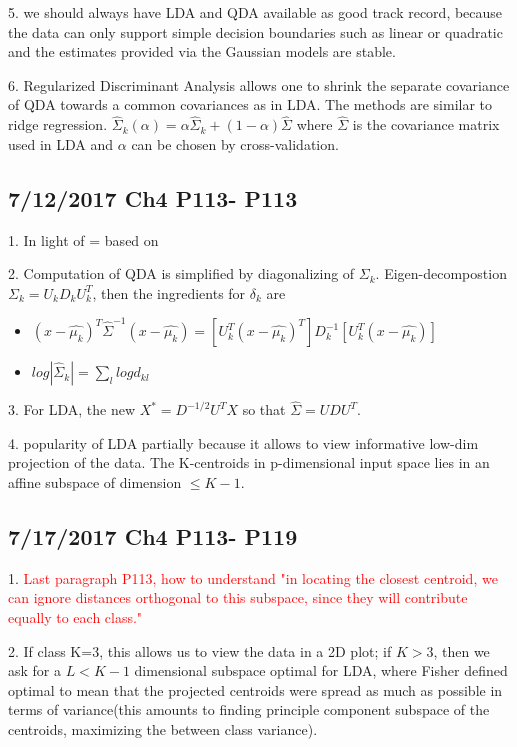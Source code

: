 \documentclass[a4paper, 12pt]{article}
\begin{document}
5. we should always have LDA and QDA available as good track record, because the data can only support simple decision boundaries such as linear or quadratic and the estimates provided via the Gaussian models are stable.

6. Regularized Discriminant Analysis allows one to shrink the separate covariance of QDA towards a common covariances as in LDA. The methods are similar to ridge regression. $\hat{\Sigma}_k(\alpha)=\alpha\hat{\Sigma}_k + (1-\alpha)\hat{\Sigma}$ where $\hat{\Sigma}$ is the covariance matrix used in LDA and $\alpha$ can be chosen by cross-validation.

\subsection*{7/12/2017 Ch4 P113- P113 }

1. In light of = based on

2. Computation of QDA is simplified by diagonalizing of $\Sigma_k$. Eigen-decompostion $\Sigma_k=U_kD_kU^T_k$, then the ingredients for $\delta_k$ are 
\begin{itemize}
	\item $(x-\hat{\mu_k})^T\hat{\Sigma}^{-1}(x-\hat{\mu_k})=[U^T_k(x-\hat{\mu_k})^T]D_k^{-1}[U^T_k(x-\hat{\mu_k})]$
	\item $log|\hat{\Sigma}_k|=\sum_{l}log d_{kl}$
\end{itemize}

3. For LDA, the new $X^*=D^{-1/2}U^TX$ so that $\hat{\Sigma}=UDU^T$.

4. popularity of LDA partially because it allows to view informative low-dim projection of the data. The K-centroids in p-dimensional input space lies in an affine subspace of dimension $\le K-1$.

\subsection*{7/17/2017 Ch4 P113- P119 }

1. \textcolor{red}{Last paragraph P113, how to understand "in locating the closest centroid, we can ignore distances orthogonal to this subspace, since they will contribute equally to each class."}

2. If class K=3, this allows us to view the data in a 2D plot; if $K > 3$, then we ask for a $L < K-1$ dimensional subspace optimal for LDA, where Fisher defined optimal to mean that the projected centroids were spread as much as possible in terms of variance(this amounts to finding principle component subspace of the centroids, maximizing the between class variance).
\end{document}
